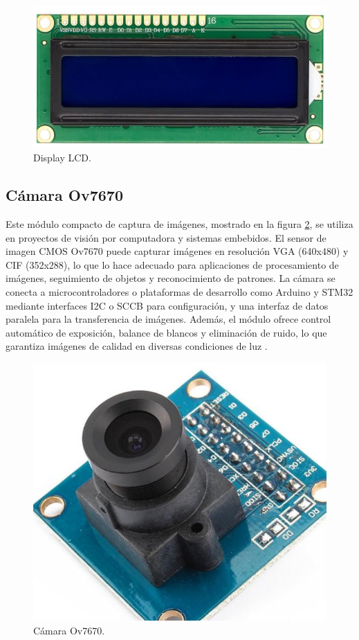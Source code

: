 \begin{figure}[htbp]
	\centering
	\includegraphics[width=.5\textwidth]{./Figures/lcd.png}
	\caption{Display LCD\protect\footnotemark.}
	\label{fig:lcd2024}
\end{figure}


\subsection{Cámara Ov7670}
\label{subsec:camara}

Este módulo compacto de captura de imágenes, mostrado en la figura \ref{fig:camara2024}, se utiliza en proyectos de visión por computadora y sistemas embebidos. El sensor de imagen CMOS Ov7670 puede capturar imágenes en resolución VGA (640x480) y CIF (352x288), lo que lo hace adecuado para aplicaciones de procesamiento de imágenes, seguimiento de objetos y reconocimiento de patrones. La cámara se conecta a microcontroladores o plataformas de desarrollo como Arduino y STM32 mediante interfaces I2C o SCCB para configuración, y una interfaz de datos paralela para la transferencia de imágenes. Además, el módulo ofrece control automático de exposición, balance de blancos y eliminación de ruido, lo que garantiza imágenes de calidad en diversas condiciones de luz \citep{WEBSITE:camara2024}.

\begin{figure}[htbp]
	\centering
	\includegraphics[width=.5\textwidth]{./Figures/camara.png}
	\caption{Cámara Ov7670\protect\footnotemark.}
	\label{fig:camara2024}
\end{figure}

